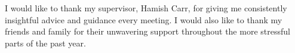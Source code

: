 I would like to thank my supervisor, Hamish Carr, for giving me consistently insightful advice and guidance
every meeting. I would also like to thank my friends and family for their unwavering support throughout the
more stressful parts of the past year.
